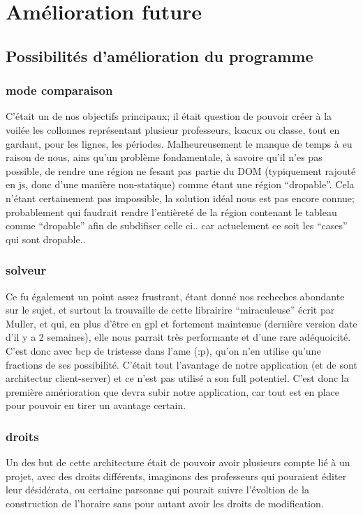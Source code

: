 \section{Amélioration future}

\subsection{Possibilités d'amélioration du programme}

\subsubsection{mode comparaison}
C'était un de nos objectifs principaux; il était question de pouvoir créer à la
voilée les collonnes représentant plusieur professeurs, loacux ou classe, tout
en gardant, pour les lignes, les périodes. Malheureusement le manque de temps à
eu raison de nous, ains qu'un problème fondamentale, à savoire qu'il n'es pas
possible, de rendre une région ne fesant pas partie du DOM (typiquement rajouté
en js, donc d'une manière non-statique) comme étant une région ``dropable''.
Cela n'étant certainement pas impossible, la solution idéal nous est pas encore
connue; probablement qui faudrait rendre l'entièreté de la région contenant le
tableau comme ``dropable'' afin de subdifiser celle ci.. car actuelement ce soit
les ``cases'' qui sont dropable..
\subsubsection{solveur}
Ce fu également un point assez frustrant, étant donné nos recheches abondante
sur le sujet, et surtout la trouvaille de cette librairire ``miraculeuse'' écrit
par Muller, et qui, en plus d'être en gpl et fortement maintenue (dernière
version date d'il y a 2 semaines), elle nous parrait très performante et d'une
rare adéquoicité.  C'est donc avec bcp de tristesse dans l'ame (:p), qu'on n'en
utilise qu'une fractions de ses possibilité.  C'était tout l'avantage de notre
application (et de sont architectur client-server) et ce n'est pas utilisé a son
full potentiel.  C'est donc la première amérioration que devra subir notre
application, car tout est en place pour pouvoir en tirer un avantage certain.
\subsubsection{droits}
Un des but de cette architecture était de pouvoir avoir plusieurs compte lié à
un projet, avec des droits différents, imaginons des professeurs qui pouraient
éditer leur désidérata, ou certaine parsonne qui pourait suivre l'évoltion de la
construction de l'horaire sans pour autant avoir les droits de modification.
